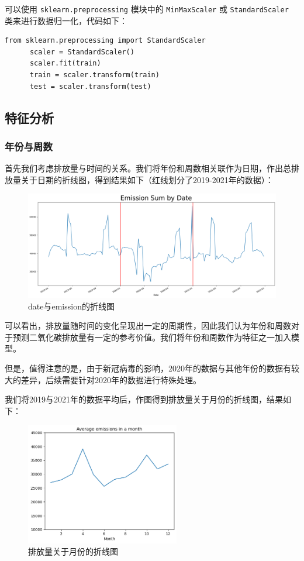 \documentclass{ctexart}
\begin{document}
可以使用 \texttt{sklearn.preprocessing} 模块中的 \texttt{MinMaxScaler} 或 \texttt{StandardScaler} 类来进行数据归一化，代码如下：

\begin{lstlisting}[style=Python]
      from sklearn.preprocessing import StandardScaler
      scaler = StandardScaler()
      scaler.fit(train)
      train = scaler.transform(train)
      test = scaler.transform(test)
\end{lstlisting}

\subsection{特征分析}

\subsubsection{年份与周数}

首先我们考虑排放量与时间的关系。我们将年份和周数相关联作为日期，作出总排放量关于日期的折线图，得到结果如下（红线划分了2019-2021年的数据）：

\begin{figure}[H]
      \centering
      \includegraphics[width=1\textwidth]{output2.png}
      \caption{date与emission的折线图}
\end{figure}

可以看出，排放量随时间的变化呈现出一定的周期性，因此我们认为年份和周数对于预测二氧化碳排放量有一定的参考价值。我们将年份和周数作为特征之一加入模型。

但是，值得注意的是，由于新冠病毒的影响，2020年的数据与其他年份的数据有较大的差异，后续需要针对2020年的数据进行特殊处理。

我们将2019与2021年的数据平均后，作图得到排放量关于月份的折线图，结果如下：

\begin{figure}[H]
      \centering
      \includegraphics[width=0.6\textwidth]{output3.png}
      \caption{排放量关于月份的折线图}
\end{figure}
\end{document}
